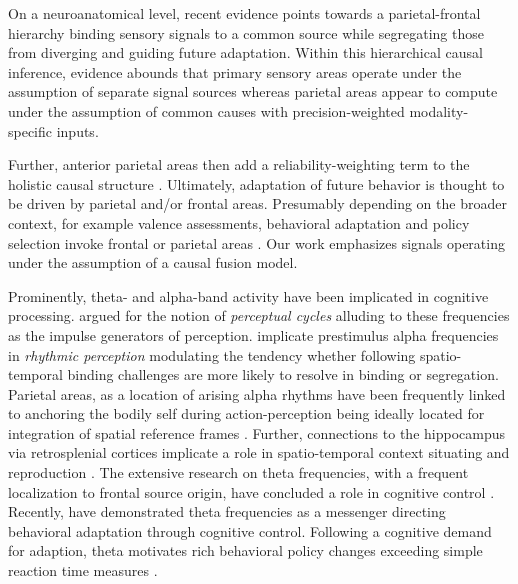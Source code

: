 On a neuroanatomical level, recent evidence points towards a parietal-frontal hierarchy binding sensory signals to a common source while segregating those from diverging and guiding future adaptation. Within this hierarchical causal inference, evidence abounds that primary sensory areas operate under the assumption of separate signal sources whereas parietal areas appear to compute under the assumption of common causes with precision-weighted modality-specific inputs. 

Further, anterior parietal areas then add a reliability-weighting term to the holistic causal structure \cite{Cao2019, Rohe2019, Cohen2013a}. Ultimately, adaptation of future behavior is thought to be driven by parietal and/or frontal areas. Presumably depending on the broader context, for example valence assessments, behavioral adaptation and policy selection invoke frontal or parietal areas \cite{Pearson2011, Kolling2016, Holroyd2002}. {Our work emphasizes signals operating under the assumption of a causal fusion model}.

Prominently, theta- and alpha-band activity have been implicated in cognitive processing. \citet{VanRullen2016} argued for the notion of \textit{perceptual cycles} alluding to these frequencies as the impulse generators of perception. \citet{Rohe2019} implicate prestimulus alpha frequencies in \textit{rhythmic perception} modulating the tendency whether following spatio-temporal binding challenges are more likely to resolve in binding or segregation. Parietal areas, as a location of arising alpha rhythms have been frequently linked to anchoring the bodily self during action-perception being ideally located for integration of spatial reference frames \cite{Blanke2015, Guterstam2015a, Halgren2019}. Further, connections to the hippocampus via retrosplenial cortices implicate a role in spatio-temporal context situating and reproduction \cite{Pearson2011, Clark2018, Gramann2009, Friston2016a}. The extensive research on theta frequencies, with a frequent localization to frontal source origin, have concluded a role in cognitive control \cite{Cavanagh2014}. Recently, \citet{Duprez2020} have demonstrated theta frequencies as a messenger directing behavioral adaptation through cognitive control. Following a cognitive demand for adaption, theta motivates rich behavioral policy changes exceeding simple reaction time measures \cite{Cooper2019}.












